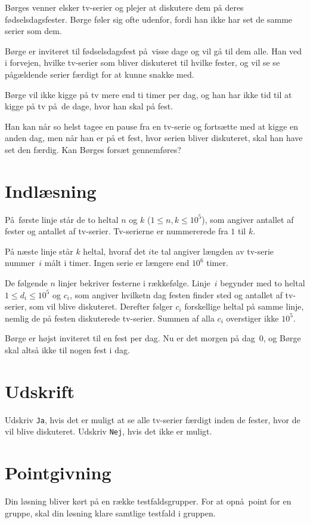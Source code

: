 Børges venner elsker tv-serier og plejer at diskutere dem på deres fødselsdagsfester.
Børge føler sig ofte udenfor, fordi han ikke har set de samme serier som dem.

Børge er inviteret til fødselsdagsfest på visse dage og vil gå til dem alle.
Han ved i forvejen, hvilke tv-serier som bliver diskuteret til hvilke fester, og vil se se pågældende serier færdigt for at kunne snakke med.

Børge vil ikke kigge på tv mere end ti timer per dag, og han har ikke tid til at kigge på tv på de dage, hvor han skal på fest.

Han kan når so helst tagee en pause fra en tv-serie og fortsætte med at kigge en anden dag, men når han er på et fest, hvor serien bliver diskuteret, skal han have set den færdig.
Kan Børges forsæt gennemføres?

\section*{Indlæsning}
På første linje står de to heltal $n$ og $k$ ($1 \leq n,k \leq 10^5$), som angiver antallet af fester og antallet af tv-serier.
Tv-serierne er nummererede fra $1$ til $k$.

På næste linje står $k$ heltal, hvoraf det $i$te tal angiver længden av tv-serie nummer~$i$ målt i timer.
Ingen serie er længere end $10^6$ timer.

De følgende $n$ linjer bekriver festerne i rækkefølge.
Linje~$i$ begynder med to heltal $1 \leq d_i \leq 10^5$ og $c_i$, som angiver hvilketn dag festen finder sted og antallet af tv-serier, som vil blive diskuteret.
Derefter følger $c_i$ forskellige heltal på samme linje, nemlig de på festen diskuterede tv-serier.
Summen af alla $c_i$ overstiger ikke $10^5$.

Børge er højst inviteret til en fest per dag. 
Nu er det morgen på dag~$0$,  og Børge skal altså ikke til nogen fest i dag.

\section*{Udskrift}
Udskriv \texttt{Ja}, hvis det er muligt at se alle tv-serier færdigt inden de fester, hvor de vil blive diskuteret.
Udskriv \texttt{Nej}, hvis det ikke er muligt.

\section*{Pointgivning}
Din løsning bliver kørt på en række testfaldsgrupper.
For at opnå point for en gruppe, skal din løsning klare samtlige testfald i gruppen.

